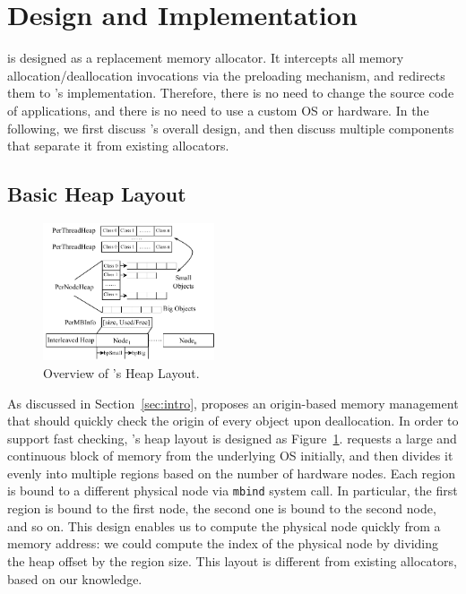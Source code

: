 \section{Design and Implementation}
\label{sec:implement}

\NM{} is designed as a replacement memory allocator. It intercepts all memory allocation/deallocation invocations via the preloading mechanism, and redirects them to \NM{}'s implementation. Therefore, there is no need to change the source code of applications, and there is no need to use a custom OS or hardware. In the following, we first discuss \NM{}'s overall design, and then discuss multiple components that separate it from existing allocators.

\subsection{Basic Heap Layout}
\label{sec:overview}

\begin{figure}[!ht]
\begin{center}
\includegraphics[width=0.45\textwidth]{figure/heaplayout1}
\end{center}
\caption{Overview of \NA{}'s Heap Layout.
\label{fig:overview}}
\end{figure}

As discussed in Section~\ref{sec:intro}, \NM{} proposes an origin-based memory management that should quickly check the origin of every object upon deallocation. In order to support fast checking, \NM{}'s heap layout is designed as  Figure~\ref{fig:overview}. \NM{} requests a large and continuous block of memory from the underlying OS initially, and then divides it evenly into multiple regions based on the number of hardware nodes. Each region is bound to a different physical node via \texttt{mbind} system call. In particular, the first region is bound to the first node, the second one is bound to the second node, and so on. This design enables us to compute the physical node quickly from a memory address: we could compute the index of the physical node by dividing the heap offset by the region size. This layout is different from existing allocators, based on our knowledge. %

